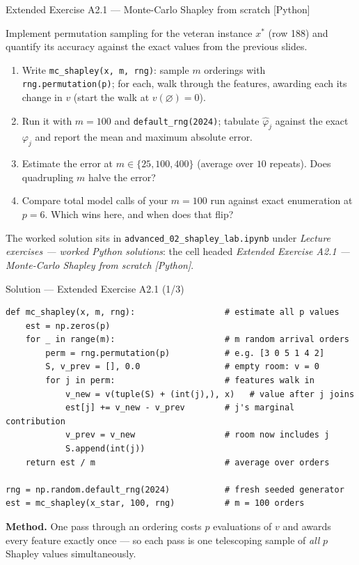 \documentclass[aspectratio=169,11pt]{beamer}
\begin{document}
\begin{frame}{Extended Exercise A2.1 --- Monte-Carlo Shapley from scratch [Python]}
\begin{longexercise}
  Implement permutation sampling for the veteran instance $x^\ast$ (row 188) and
  quantify its accuracy against the exact values from the previous slides.
  \begin{enumerate}
    \item Write \texttt{mc\_shapley(x, m, rng)}: sample $m$ orderings with
          \texttt{rng.permutation(p)}; for each, walk through the features,
          awarding each its change in $v$ (start the walk at $v(\varnothing)=0$).
    \item Run it with $m=100$ and \texttt{default\_rng(2024)}; tabulate
          $\hat\varphi_j$ against the exact $\varphi_j$ and report the mean and
          maximum absolute error.
    \item Estimate the error at $m\in\{25, 100, 400\}$ (average over $10$
          repeats). Does quadrupling $m$ halve the error?
    \item Compare total model calls of your $m=100$ run against exact
          enumeration at $p=6$. Which wins here, and when does that flip?
  \end{enumerate}
\end{longexercise}
\begin{labnote}
  The worked solution sits in \texttt{advanced\_02\_shapley\_lab.ipynb} under
  \emph{Lecture exercises --- worked Python solutions}: the cell headed
  \emph{Extended Exercise A2.1 --- Monte-Carlo Shapley from scratch [Python]}.
\end{labnote}
\end{frame}

\begin{frame}[fragile]{Solution --- Extended Exercise A2.1 (1/3)}
\begin{solutionbox}
  \begin{lstlisting}[basicstyle=\ttfamily\scriptsize]
def mc_shapley(x, m, rng):                  # estimate all p values
    est = np.zeros(p)
    for _ in range(m):                      # m random arrival orders
        perm = rng.permutation(p)           # e.g. [3 0 5 1 4 2]
        S, v_prev = [], 0.0                 # empty room: v = 0
        for j in perm:                      # features walk in
            v_new = v(tuple(S) + (int(j),), x)   # value after j joins
            est[j] += v_new - v_prev        # j's marginal contribution
            v_prev = v_new                  # room now includes j
            S.append(int(j))
    return est / m                          # average over orders

rng = np.random.default_rng(2024)           # fresh seeded generator
est = mc_shapley(x_star, 100, rng)          # m = 100 orders
  \end{lstlisting}
  \textbf{Method.} One pass through an ordering costs $p$ evaluations of $v$ and
  awards every feature exactly once --- so each pass is one telescoping sample of
  \emph{all} $p$ Shapley values simultaneously.
\end{solutionbox}
\end{frame}
\end{document}
